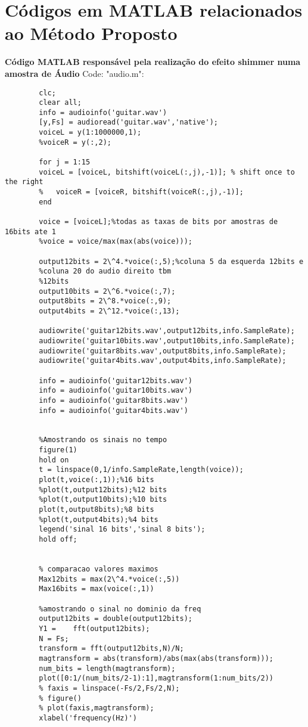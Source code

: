 \section{Códigos em MATLAB relacionados ao Método Proposto}

\textbf{Código MATLAB responsável pela realização do efeito shimmer numa amostra de Áudio}
	Code: "audio.m":
	\begin{lstlisting}
		clc;
		clear all;
		info = audioinfo('guitar.wav')
		[y,Fs] = audioread('guitar.wav','native');
		voiceL = y(1:1000000,1);
		%voiceR = y(:,2);
		
		for j = 1:15
		voiceL = [voiceL, bitshift(voiceL(:,j),-1)]; % shift once to the right
		%   voiceR = [voiceR, bitshift(voiceR(:,j),-1)];
		end
		
		voice = [voiceL];%todas as taxas de bits por amostras de 16bits ate 1
		%voice = voice/max(max(abs(voice)));
		
		output12bits = 2\^4.*voice(:,5);%coluna 5 da esquerda 12bits e 
		%coluna 20 do audio direito tbm
		%12bits
		output10bits = 2\^6.*voice(:,7);
		output8bits = 2\^8.*voice(:,9);
		output4bits = 2\^12.*voice(:,13);
		
		audiowrite('guitar12bits.wav',output12bits,info.SampleRate);
		audiowrite('guitar10bits.wav',output10bits,info.SampleRate);
		audiowrite('guitar8bits.wav',output8bits,info.SampleRate);
		audiowrite('guitar4bits.wav',output4bits,info.SampleRate);
		
		info = audioinfo('guitar12bits.wav')
		info = audioinfo('guitar10bits.wav')
		info = audioinfo('guitar8bits.wav')
		info = audioinfo('guitar4bits.wav')
		
		
		%Amostrando os sinais no tempo
		figure(1)
		hold on
		t = linspace(0,1/info.SampleRate,length(voice));
		plot(t,voice(:,1));%16 bits
		%plot(t,output12bits);%12 bits
		%plot(t,output10bits);%10 bits
		plot(t,output8bits);%8 bits
		%plot(t,output4bits);%4 bits
		legend('sinal 16 bits','sinal 8 bits');
		hold off;
		
		
		% comparacao valores maximos
		Max12bits = max(2\^4.*voice(:,5))
		Max16bits = max(voice(:,1))
		
		%amostrando o sinal no dominio da freq
		output12bits = double(output12bits);
		Y1 =    fft(output12bits);
		N = Fs;
		transform = fft(output12bits,N)/N;
		magtransform = abs(transform)/abs(max(abs(transform)));
		num_bits = length(magtransform);
		plot([0:1/(num_bits/2-1):1],magtransform(1:num_bits/2))
		% faxis = linspace(-Fs/2,Fs/2,N);
		% figure()
		% plot(faxis,magtransform);
		xlabel('frequency(Hz)')
		

\end{lstlisting}
